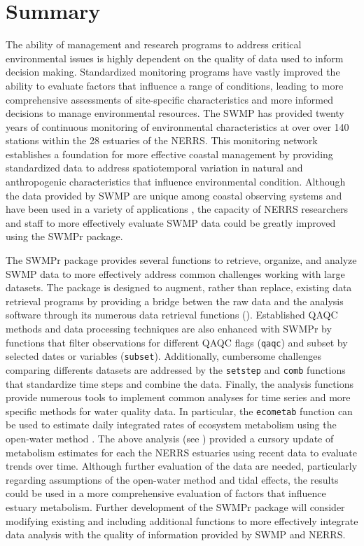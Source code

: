 \documentclass[10pt,letterpaper]{article}\usepackage[]{graphicx}\usepackage[]{color}
\begin{document}
\section*{Summary}

The ability of management and research programs to address critical environmental issues is highly dependent on the quality of data used to inform decision making.  Standardized monitoring programs have vastly improved the ability to evaluate factors that influence a range of conditions, leading to more comprehensive assessments of site-specific characteristics and more informed decisions to manage environmental resources.  The \acrlong{SWMP} has provided twenty years of continuous monitoring of environmental characteristics at over over 140 stations within the 28 estuaries of the \acrlong{NERRS}.  This monitoring network establishes a foundation  for more effective coastal management by providing standardized data to address spatiotemporal variation in natural and anthropogenic characteristics that influence environmental condition.  Although the data provided by \gls{SWMP} are unique among coastal observing systems and have been used in a variety of applications \cite{Bulthius95,Caffrey03,Sanger02,Wenner04,Dix08}, the capacity of \gls{NERRS} researchers and staff to more effectively evaluate \gls{SWMP} data could be greatly improved using the SWMPr package.

The SWMPr package provides several functions to retrieve, organize, and analyze \gls{SWMP} data to more effectively address common challenges working with large datasets.  The package is designed to augment, rather than replace, existing data retrieval programs by providing a bridge betwen the raw data and the analysis software through its numerous data retrieval functions ().  Established \gls{QAQC} methods and data processing techniques are also enhanced with SWMPr by functions that filter observations for different \gls{QAQC} flags (\texttt{qaqc}) and subset by selected dates or variables (\texttt{subset}).  Additionally, cumbersome challenges comparing differents datasets are addressed by the \texttt{setstep} and \texttt{comb} functions that standardize time steps and combine the data.  Finally, the analysis functions provide numerous tools to implement common analyses for time series and more specific methods for water quality data.  In particular, the \texttt{ecometab} function can be used to estimate daily integrated rates of ecosystem metabolism using the open-water method \cite{Odum56,Caffrey14}.  The above analysis (see ) provided a cursory update of metabolism estimates for each the \gls{NERRS} estuaries using recent data to evaluate trends over time.  Although further evaluation of the data are needed, particularly regarding assumptions of the open-water method and tidal effects, the results could be used in a more comprehensive evaluation of factors that influence estuary metabolism. Further development of the SWMPr package will consider modifying existing and including additional functions to more effectively integrate data analysis with the quality of information provided by \gls{SWMP} and \gls{NERRS}. 
\end{document}
